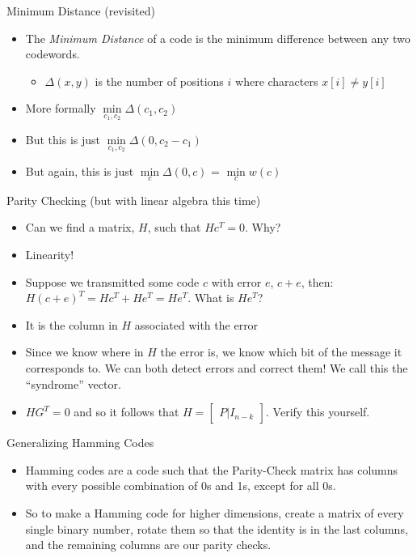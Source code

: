 \documentclass[aspectratio=169]{beamer}
\begin{document}
\begin{frame}{Minimum Distance (revisited)}
    \begin{itemize}
        \item The \emph{Minimum Distance} of a code is the minimum difference between any two codewords. 
        \begin{itemize}
            \item $\Delta(x, y)$ is the number of positions $i$ where characters $x[i] \neq y[i]$ 
        \end{itemize} \pause
        \item More formally $\min\limits_{c_1, c_2} \Delta(c_1, c_2)$ \pause
        \item But this is just $\min\limits_{c_1, c_2} \Delta(0, c_2 - c_1)$ \pause 
        \item But again, this is just $\min\limits_{c} \Delta(0, c)$ = $\min\limits_c w(c)$
    \end{itemize}
\end{frame}

\begin{frame}{Parity Checking (but with linear algebra this time)}
    \begin{itemize}
        \item Can we find a matrix, $H$, such that $Hc^T = 0$. \pause Why? \pause
        \item Linearity! 
        \item Suppose we transmitted some code $c$ with error $e$, $c + e$, then: $H(c + e)^T = Hc^T + He^T = He^T$. What is $He^T$? \pause 
        \item It is the column in $H$ associated with the error \pause 
        \item Since we know where in $H$ the error is, we know which bit of the message it corresponds to. We can both detect errors and correct them! We call this the ``syndrome'' vector. \pause 
        \item $HG^T = 0$ and so it follows that $H = \begin{bmatrix}P | I_{n - k} \end{bmatrix}$. Verify this yourself. 
    \end{itemize}
\end{frame}

\begin{frame}{Generalizing Hamming Codes}
    \begin{itemize}
        \item Hamming codes are a code such that the Parity-Check matrix has columns with every possible combination of 0s and 1s, except for all 0s. \pause 
        \item So to make a Hamming code for higher dimensions, create a matrix of every single binary number, rotate them so that the identity is in the last columns, and the remaining columns are our parity checks. 
    \end{itemize}
\end{frame}
\end{document}
